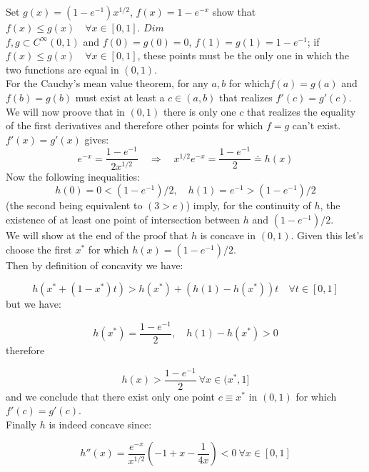 \documentclass[10pt,a4paper]{report}
\author{D. Doimo}
\begin{document}
Set $g(x)=(1-e^{-1})x^{1/2}$, $f(x)=1-e^{-x}$ show that $f(x) \leq g(x) \quad \forall x\in[0,1]$.\vspace{5mm}
$Dim$\\
$f,g \subset C^{\infty}(0,1)$ and $f(0)=g(0)=0$,  $f(1)=g(1)=1-e^{-1}$; if $f(x) \leq g(x) \quad \forall x\in[0,1]$, these points must be the only one in which the two functions are equal in $(0,1)$. \\
For the Cauchy's mean value theorem, for any ${a,b}$ for which$f(a)=g(a)$ and $f(b)=g(b)$ must exist at least a $c\in(a,b)$ that realizes $f'(c)=g'(c)$. We will now proove that in $(0,1)$ there is only one $c$ that realizes the equality of the first derivatives and therefore other points for which $f=g$ can't exist.\\
$f'(x)=g'(x)$ gives:
\begin{equation}
e^{-x}=\dfrac{1-e^{-1}}{2x^{1/2}}\quad \Rightarrow \quad x^{1/2}e^{-x}=\dfrac{1-e^{-1}}{2}\doteq h(x)
\end{equation}
Now the following inequalities:
\begin{equation}
h(0)=0<(1-e^{-1})/2, \quad h(1)=e^{-1}>(1-e^{-1})/2
\end{equation}
(the second being equivalent to $(3>e)$) imply, for the continuity of $h$, the existence of at least one point of intersection between $h$ and $(1-e^{-1})/2$.\\
We will show at the end of the proof that $h$ is concave in $(0,1)$. Given this let's choose the first $x^{*}$ for which $h(x)=(1-e^{-1})/2$. \\
Then by definition of concavity we have:

\begin{equation}
h(x^{*}+(1-x^{*})t)> h(x^{*})+(h(1)-h(x^{*}))t \quad \forall t \in [0,1]
\end{equation}
but we have:

\begin{equation}
h(x^{*})=\dfrac{1-e^{-1}}{2}, \quad h(1)-h(x^{*})>0
\end{equation}
therefore

\begin{equation}
h(x)>\dfrac{1-e^{-1}}{2} \ \forall x \in(x^{*},1]
\end{equation}
and we conclude that there exist only one point $c\equiv x^{*}$ in $(0,1)$ for which $f'(c)=g'(c)$.\\

Finally $h$ is indeed concave since:

\begin{equation}
h''(x)=\dfrac{e^{-x}}{x^{1/2}}\left(-1+x-\dfrac{1}{4x}\right)<0 \ \forall x\in[0,1]
\end{equation}
\end{document}
